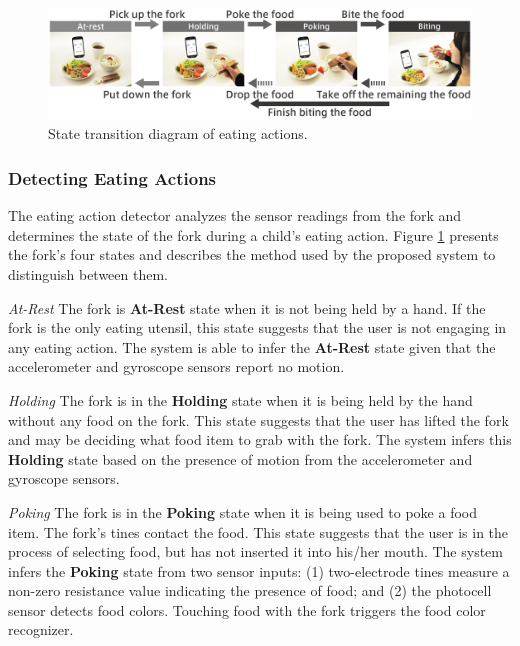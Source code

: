 \begin{figure}[t]
\begin{center}
\includegraphics[width=15cm]{image/status02-02.png}
\caption{State transition diagram of eating actions.}
\label{action}
\end{center}
\end{figure}

\subsubsection{Detecting Eating Actions}
The eating action detector analyzes the sensor readings 
from the fork and determines the state of the fork during a child's eating action. 
Figure \ref{action} presents the fork's four states 
and describes the method used by the proposed system to distinguish between them. 

\textit{At-Rest}
\newline
The fork is \textbf{At-Rest} state when it is not being held by a hand. 
If the fork is the only eating utensil, this state suggests that the user is not engaging in any eating action. 
The system is able to infer the \textbf{At-Rest} state given that the accelerometer and gyroscope sensors report no motion.

\textit{Holding}
\newline
The fork is in the \textbf{Holding} state when it is being held by the hand without any food on the fork. 
This state suggests that the user has lifted the fork and may be deciding what food item to grab with the fork. 
The system infers this \textbf{Holding} state based on the presence of motion from the accelerometer and gyroscope sensors.

\textit{Poking}
\newline
The fork is in the \textbf{Poking} state 
when it is being used to poke a food item. 
The fork's tines contact the food. 
This state suggests that the user is in the process of selecting food, 
but has not inserted it into his/her mouth. 
The system infers the \textbf{Poking} state from two sensor inputs: 
(1) two-electrode tines measure a non-zero resistance value indicating the presence of food; 
and (2) the photocell sensor detects food colors. Touching food with the fork triggers the food color recognizer. 

